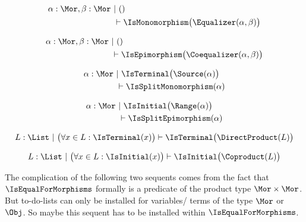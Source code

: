 \begin{sequent}
\begin{align*}
  \alpha:\Mor, \beta:\Mor  ~&|~ () \\
  &\vdash \IsMonomorphism\big( \Equalizer( \alpha, \beta ) \big)
\end{align*}
\end{sequent}

\begin{sequent}
\begin{align*}
  \alpha:\Mor, \beta:\Mor  ~&|~ () \\
  &\vdash \IsEpimorphism\big( \Coequalizer( \alpha, \beta ) \big)
\end{align*}
\end{sequent}

\begin{sequent}\label{sequent:no_proper_context_7}
\begin{align*}
  \alpha:\Mor ~&|~ \IsTerminal\big( \Source( \alpha ) \big)\\
  &\vdash \IsSplitMonomorphism( \alpha )
\end{align*}
\end{sequent}

\begin{sequent}\label{sequent:no_proper_context_8}
\begin{align*}
  \alpha:\Mor ~&|~ \IsInitial\big( \Range( \alpha ) \big)\\
  &\vdash \IsSplitEpimorphism( \alpha )
\end{align*}
\end{sequent}

\begin{sequent}
\begin{align*}
  L: \List ~|~ \big(\forall x \in L: \IsTerminal(x)\big) \vdash \IsTerminal\big( \DirectProduct( L ) \big)
\end{align*}
\end{sequent}

\begin{sequent}
\begin{align*}
  L: \List ~|~ \big(\forall x \in L: \IsInitial(x)\big) \vdash \IsInitial\big( \Coproduct( L ) \big)
\end{align*}
\end{sequent}

The complication of the following two sequents comes from the fact that
$\IsEqualForMorphisms$ formally is a predicate of the product type 
$\Mor \times \Mor$. But to-do-lists can only be installed for variables/ terms
of the type $\Mor$ or $\Obj$. So maybe this sequent has to be installed
within $\IsEqualForMorphisms$.

